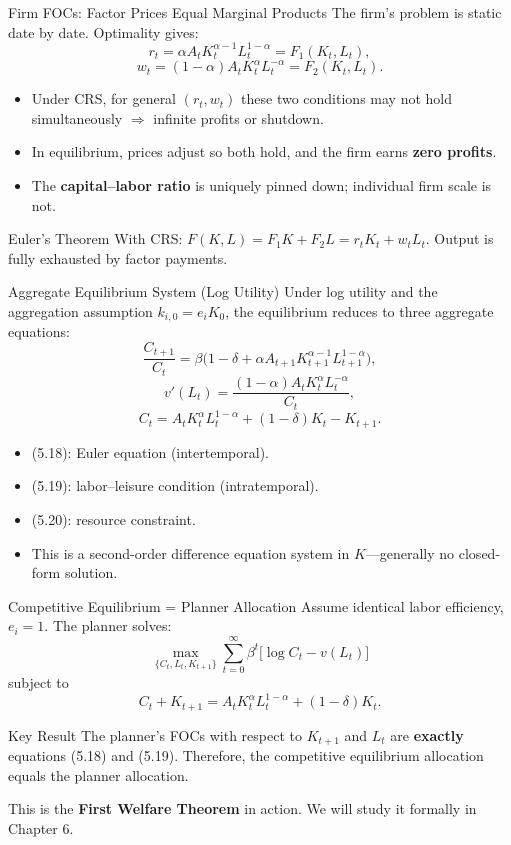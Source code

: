 \documentclass[aspectratio=169,10pt]{beamer}
\newcommand{\apxbutton}[1]{\hfill\hyperlink{#1}{\beamerbutton{Appendix}}}
\begin{document}
\begin{frame}{Firm FOCs: Factor Prices Equal Marginal Products}
The firm's problem is static date by date. Optimality gives:
\[
r_t=\alpha A_t K_t^{\alpha-1}L_t^{1-\alpha} = F_1(K_t,L_t),
\]
\[
w_t=(1-\alpha)A_t K_t^\alpha L_t^{-\alpha} = F_2(K_t,L_t).
\]

\begin{itemize}
  \item Under CRS, for general $(r_t,w_t)$ these two conditions may not hold simultaneously $\Rightarrow$ infinite profits or shutdown.
  \item In equilibrium, prices adjust so both hold, and the firm earns \textbf{zero profits}.
  \item The \textbf{capital--labor ratio} is uniquely pinned down; individual firm scale is not.
\end{itemize}

\begin{block}{Euler's Theorem}
With CRS: $F(K,L)=F_1 K + F_2 L = r_t K_t + w_t L_t$. Output is fully exhausted by factor payments.
\end{block}
\end{frame}

\begin{frame}{Aggregate Equilibrium System (Log Utility)}
\hypertarget{m-a4}{}
Under log utility and the aggregation assumption $k_{i,0}=e_i K_0$, the equilibrium reduces to three aggregate equations:
\[
\frac{C_{t+1}}{C_t}
=
\beta\Big(1-\delta+\alpha A_{t+1}K_{t+1}^{\alpha-1}L_{t+1}^{1-\alpha}\Big),
\tag{5.18}
\]
\[
v'(L_t)
=
\frac{(1-\alpha)A_t K_t^\alpha L_t^{-\alpha}}{C_t},
\tag{5.19}
\]
\[
C_t
=
A_tK_t^\alpha L_t^{1-\alpha}
+(1-\delta)K_t-K_{t+1}.
\tag{5.20}
\]

\begin{itemize}
  \item (5.18): Euler equation (intertemporal).
  \item (5.19): labor--leisure condition (intratemporal).
  \item (5.20): resource constraint.
  \item This is a second-order difference equation system in $K$---generally no closed-form solution.
\end{itemize}
\end{frame}

\begin{frame}{Competitive Equilibrium = Planner Allocation}
Assume identical labor efficiency, $e_i=1$. The planner solves:
\[
\max_{\{C_t,L_t,K_{t+1}\}}
\sum_{t=0}^{\infty}\beta^t\big[\log C_t-v(L_t)\big]
\]
subject to
\[
C_t+K_{t+1}=A_tK_t^\alpha L_t^{1-\alpha}+(1-\delta)K_t.
\]

\begin{block}{Key Result}
The planner's FOCs with respect to $K_{t+1}$ and $L_t$ are \textbf{exactly} equations (5.18) and (5.19). Therefore, the competitive equilibrium allocation equals the planner allocation.
\end{block}

\medskip
This is the \textbf{First Welfare Theorem} in action. We will study it formally in Chapter 6.
\apxbutton{a4}
\end{frame}
\end{document}
